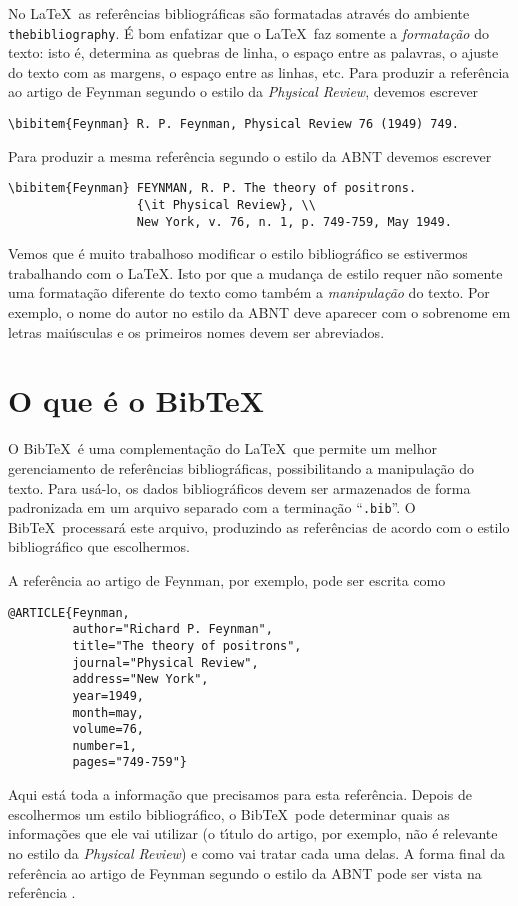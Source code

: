 \documentclass[a4paper,12pt]{article}
\newcommand{\ii}{\'{\i}}
\newcommand{\ca}{\c{c}\~ao}
\newcommand{\co}{\c{c}\~oes}
\begin{document}
No \LaTeX\ as refer\^encias bibliogr\'aficas s\~ao formatadas 
atrav\'es do ambiente \verb+thebibliography+.
\'E bom enfatizar que o \LaTeX\ faz somente
a {\it formata{\ca}} do texto: 
isto \'e, determina as quebras de linha, o espa\c{c}o
entre as palavras, o ajuste do texto com as margens, o espa\c{c}o 
entre as linhas, etc. Para produzir a refer\^encia ao artigo
de Feynman segundo o estilo da {\it Physical Review},
devemos escrever
\begin{verbatim}
\bibitem{Feynman} R. P. Feynman, Physical Review 76 (1949) 749.
\end{verbatim}
Para produzir a mesma refer\^encia segundo o estilo da ABNT
devemos escre\-ver
\begin{verbatim}
\bibitem{Feynman} FEYNMAN, R. P. The theory of positrons.
                  {\it Physical Review}, \\ 
                  New York, v. 76, n. 1, p. 749-759, May 1949.
\end{verbatim}
Vemos que \'e muito trabalhoso modificar o estilo bibliogr\'afico
se estivermos trabalhando com o \LaTeX . Isto por que a mudan\c{c}a
de estilo requer n\~ao somente uma formata{\ca} diferente do texto
como tamb\'em a {\it manipula{\ca}} do texto. Por exemplo, o nome
do autor no estilo da ABNT deve aparecer com o sobrenome em letras
mai\'usculas e os primeiros nomes devem ser abreviados.



\section{O que \'e o Bib\TeX\ }



O Bib\TeX\ \'e uma complementa{\ca} do \LaTeX\ que permite um melhor
gerenciamento de refer\^encias bibliogr\'aficas, possibilitando
a manipula{\ca} do texto.
Para us\'a-lo,
os dados bibliogr\'aficos devem ser armazenados de forma padro\-ni\-zada
em um arquivo separado com a termina{\ca} ``\verb+.bib+''.
O Bib\TeX\ processar\'a este arquivo, produzindo as refer\^encias
de acordo com o estilo biblio\-gr\'afico que escolhermos.

A refer\^encia ao artigo de Feynman, por exemplo, pode ser escrita como
\begin{verbatim}
@ARTICLE{Feynman,
         author="Richard P. Feynman", 
         title="The theory of positrons",
         journal="Physical Review",
         address="New York",
         year=1949,
         month=may,
         volume=76,
         number=1,
         pages="749-759"}
\end{verbatim}
Aqui est\'a toda a informa{\ca} que precisamos para esta
refer\^encia. Depois de escolhermos um estilo bibliogr\'afico,
o Bib\TeX\ pode determinar quais as informa{\co} que ele
vai utilizar (o t{\ii}tulo do artigo, por exemplo,  n\~ao \'e
relevante no estilo da {\it Physical Review}) e como vai tratar
cada uma delas. A forma final da refer\^encia ao artigo de Feynman
segundo o estilo da ABNT pode ser vista na refer\^encia 
\cite{Feynman}.
\end{document}
